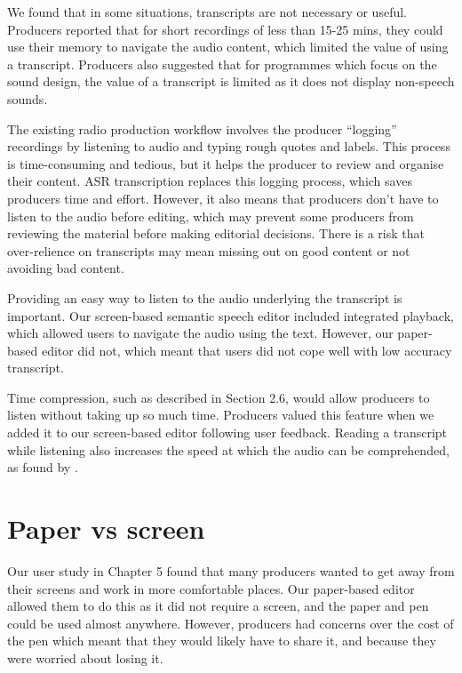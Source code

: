 We found that in some situations, transcripts are not necessary or useful. Producers reported that for short recordings
of less than 15-25 mins, they could use their memory to navigate the audio content, which limited the value of using a
transcript. Producers also suggested that for programmes which focus on the sound design, the value of a transcript is
limited as it does not display non-speech sounds.

The existing radio production workflow involves the producer ``logging'' recordings by listening to audio and typing
rough quotes and labels.  This process is time-consuming and tedious, but it helps the producer to review and organise
their content.  ASR transcription replaces this logging process, which saves producers time and effort. However, it
also means that producers don't have to listen to the audio before editing, which may prevent some producers from
reviewing the material before making editorial decisions.  There is a risk that over-relience on transcripts may mean
missing out on good content or not avoiding bad content.


Providing an easy way to listen to the audio underlying the transcript is important. Our screen-based semantic speech
editor included integrated playback, which allowed users to navigate the audio using the text. However, our paper-based
editor did not, which meant that users did not cope well with low accuracy transcript.

Time compression, such as described in Section 2.6, would allow producers to listen without taking up so much time.
Producers valued this feature when we added it to our screen-based editor following user feedback. Reading a transcript
while listening also increases the speed at which the audio can be comprehended, as found by \citet{Vemuri2004}.

\section{Paper vs screen}

Our user study in Chapter 5 found that many producers wanted to get away from their screens and work in more
comfortable places. Our paper-based editor allowed them to do this as it did not require a screen, and the paper and
pen could be used almost anywhere. However, producers had concerns over the cost of the pen which meant that they would
likely have to share it, and because they were worried about losing it.

